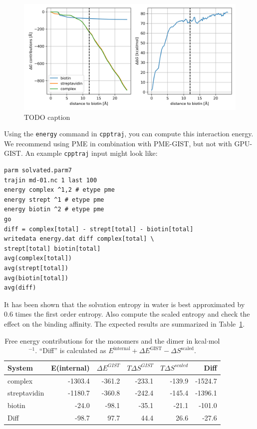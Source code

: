 \documentclass[9pt,tutorial]{livecoms}
\newcommand{\software}{\texttt}
\newcommand{\todo}{\textcolor{red}}
\newcommand\inlinecode{\texttt}
\begin{document}
\begin{figure}
	\centering
	\includegraphics[width=1.0\linewidth]{figures/deltaG-difference.png}
	\caption{TODO caption}\label{fig-dg-sums}
\end{figure}

Using the \inlinecode{energy} command in \software{cpptraj}, you can compute this interaction energy.
We recommend using PME in combination with PME-GIST, but not with GPU-GIST\@.
An example \software{cpptraj} input might look like:
\begin{lstlisting}[style=cpptraj]
parm solvated.parm7
trajin md-01.nc 1 last 100
energy complex ^1,2 # etype pme
energy strept ^1 # etype pme
energy biotin ^2 # etype pme
go
diff = complex[total] - strept[total] - biotin[total]
writedata energy.dat diff complex[total] \
strept[total] biotin[total]
avg(complex[total])
avg(strept[total])
avg(biotin[total])
avg(diff)
\end{lstlisting}

It has been shown \cite{Chen2021,Waibl2022-gist-solvents} that the solvation entropy in water is best approximated by 0.6 times the first order entropy.
Also compute the scaled entropy and check the effect on the binding affinity.
The expected results are summarized in Table~\ref{tab_dg_monomers_dimer}.

\begin{table}[h]
	\caption{Free energy contributions for the monomers and the dimer in kcal$\cdot$mol$^{-1}$. ``Diff'' is calculated as $E^\text{internal} + \Delta E^\text{GIST} - \Delta S^\text{scaled}$.}\label{tab_dg_monomers_dimer}
	\small
	\begin{tabular}{@{}lrrrrr@{}}
		\toprule
		System       & E(internal) & $\Delta E^\textit{GIST}$ & $T\Delta S^\textit{GIST}$ & $T\Delta S^\textit{scaled}$ & Diff \\
		\midrule
		complex      & -1303.4 & -361.2 & -233.1 & -139.9 & -1524.7 \\
		streptavidin & -1180.7 & -360.8 & -242.4 & -145.4 & -1396.1 \\
		biotin       & -24.0   &  -98.1 &  -35.1 &  -21.1 &  -101.0 \\
		Diff         & -98.7   &   97.7 &   44.4 &   26.6 &   -27.6 \\
		\bottomrule
	\end{tabular}
\end{table}
\end{document}
